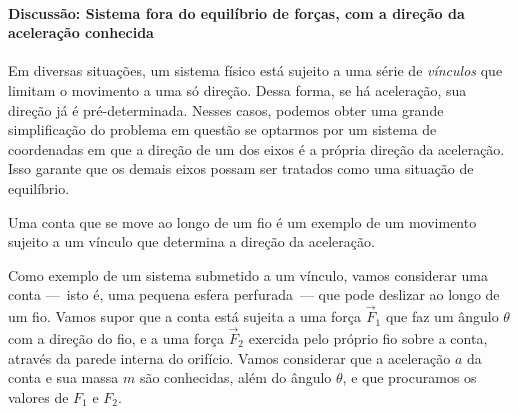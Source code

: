 

\paragraph{Discussão: Sistema fora do equilíbrio de forças, com a direção da aceleração conhecida}

Em diversas situações, um sistema físico está sujeito a uma série de \emph{vínculos} que limitam o movimento a uma só direção. Dessa forma, se há aceleração, sua direção já é pré-determinada. Nesses casos, podemos obter uma grande simplificação do problema em questão se optarmos por um sistema de coordenadas em que a direção de um dos eixos é a própria direção da aceleração. Isso garante que os demais eixos possam ser tratados como uma situação de equilíbrio.

\begin{marginfigure}
\centering
{}
\caption{Uma conta que se move ao longo de um fio é um exemplo de um movimento sujeito a um vínculo que determina a direção da aceleração.\label{Fig:ContaDeslisandoEmFio}}
\end{marginfigure}

Como exemplo de um sistema submetido a um vínculo, vamos considerar uma conta ---~isto é, uma pequena esfera perfurada~--- que pode deslizar ao longo de um fio. Vamos supor que a conta está sujeita a uma força $\vec{F}_1$ que faz um ângulo $\theta$ com a direção do fio, e a uma força $\vec{F}_2$ exercida pelo próprio fio sobre a conta, através da parede interna do orifício. Vamos considerar que a aceleração $a$ da conta e sua massa $m$ são conhecidas, além do ângulo $\theta$, e que procuramos os valores de $F_1$ e $F_2$.

